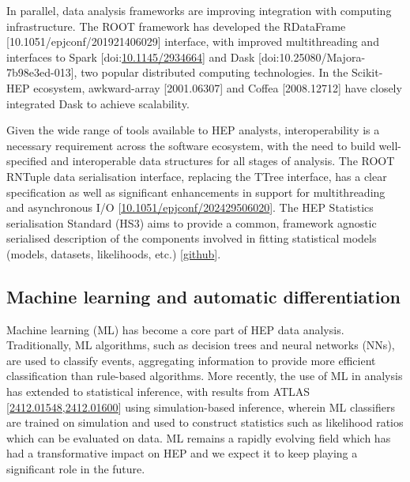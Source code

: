 In parallel, data analysis frameworks are improving integration with
computing infrastructure. The ROOT framework has developed the
RDataFrame {[}10.1051/epjconf/201921406029{]} interface, with improved
multithreading and interfaces to Spark
{[}doi:\href{https://doi.org/10.1145/2934664}{\ul{10.1145/2934664}}{]}
and Dask {[}doi:10.25080/Majora-7b98e3ed-013{]}, two popular distributed
computing technologies. In the Scikit-HEP ecosystem, awkward-array
{[}2001.06307{]} and Coffea {[}2008.12712{]} have closely integrated
Dask to achieve scalability.

Given the wide range of tools available to HEP analysts,
interoperability is a necessary requirement across the software
ecosystem, with the need to build well-specified and interoperable data
structures for all stages of analysis. The ROOT RNTuple data
serialisation interface, replacing the TTree interface, has a clear
specification as well as significant enhancements in support for
multithreading and asynchronous I/O
{[}\href{https://doi.org/10.1051/epjconf/202429506020}{\ul{10.1051/epjconf/202429506020}}{]}.
The HEP Statistics serialisation Standard (HS3) aims to provide a
common, framework agnostic serialised description of the components
involved in fitting statistical models (models, datasets, likelihoods,
etc.)
{[}\href{https://github.com/hep-statistics-serialization-standard/hep-statistics-serialization-standard}{\ul{github}}{]}.

\subsection{Machine learning and automatic
differentiation}\label{machine-learning-and-automatic-differentiation}

Machine learning (ML) has become a core part of HEP data analysis.
Traditionally, ML algorithms, such as decision trees and neural networks
(NNs), are used to classify events, aggregating information to provide
more efficient classification than rule-based algorithms. More recently,
the use of ML in analysis has extended to statistical inference, with
results from ATLAS
{[}\href{https://arxiv.org/pdf/2412.01548}{\ul{2412.01548}},\href{https://arxiv.org/pdf/2412.01600}{\ul{2412.01600}}{]}
using simulation-based inference, wherein ML classifiers are trained on
simulation and used to construct statistics such as likelihood ratios
which can be evaluated on data. ML remains a rapidly evolving field
which has had a transformative impact on HEP and we expect it to keep
playing a significant role in the future.

